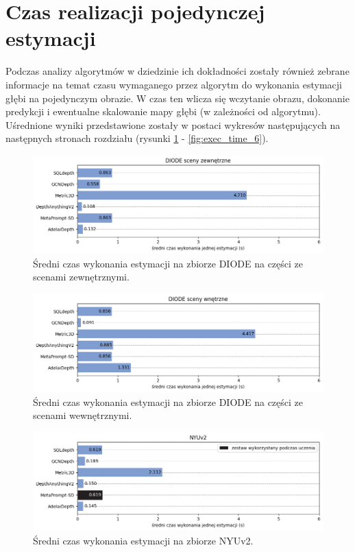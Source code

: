 \section{Czas realizacji pojedynczej estymacji}
Podczas analizy algorytmów w dziedzinie ich dokładności zostały również zebrane informacje na temat czasu wymaganego przez algorytm do wykonania estymacji głębi na pojedynczym obrazie. W czas ten wlicza się wczytanie obrazu, dokonanie predykcji i ewentualne skalowanie mapy głębi (w zależności od algorytmu). Uśrednione wyniki przedstawione zostały w postaci wykresów następujących na następnych stronach rozdziału (rysunki \ref{fig:exec_time_0} - \ref{fig:exec_time_6}).
\begin{figure}[H]
    \centering
    \includegraphics{plots/exec_time/0}
    \caption{Średni czas wykonania estymacji na zbiorze DIODE na części ze scenami zewnętrznymi.}
    \label{fig:exec_time_0}
\end{figure}
\begin{figure}[H]
    \centering
    \includegraphics{plots/exec_time/1}
    \caption{Średni czas wykonania estymacji na zbiorze DIODE na części ze scenami wewnętrznymi.}
    \label{fig:exec_time_1}
\end{figure}
\begin{figure}[H]
    \centering
    \includegraphics{plots/exec_time/2}
    \caption{Średni czas wykonania estymacji na zbiorze NYUv2.}
    \label{fig:exec_time_2}
\end{figure}
